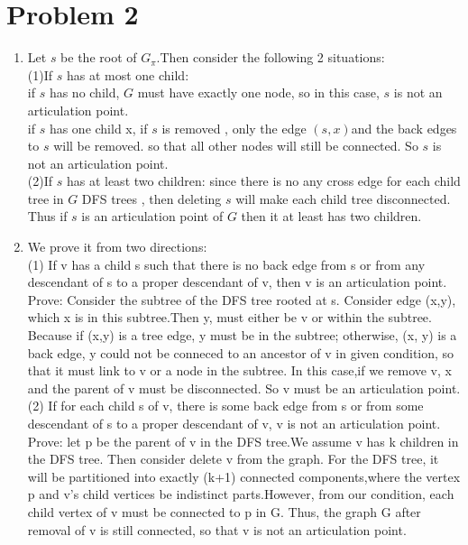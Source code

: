 \documentclass[paper=a4, fontsize=11pt]{scrartcl} %
\numberwithin{equation}{section} %
\numberwithin{figure}{section} %
\numberwithin{table}{section} %
\begin{document}
\section*{Problem 2}

\begin{enumerate}[label={2.(\alph*)}]
 \item Let ${s}$ be the root of ${G_\pi}$.Then consider the following 2 situations: \\
(1)If ${s}$ has at most one child: \\
if ${s}$ has no child, ${G}$ must have exactly one node, so in this case, ${s}$ is not an articulation point.\\
if ${s}$ has one child x, if ${s}$ is removed , only the edge ${(s,x)}$and the back edges to ${s}$ will be removed. so that all other nodes will still be connected. So ${s}$ is not an articulation point.\\
(2)If  ${s}$ has at least two children: since there is no any cross edge for each child tree in ${G}$ DFS trees , then deleting  ${s}$ will make each child tree disconnected. Thus if ${s}$ is an articulation point of ${G}$ then it at least has two children.

  \item 
We prove it from two directions:\\
(1) If v has a child s such that there is no back edge from s or from any descendant
of s to a proper descendant of v, then v is an articulation point.\\
Prove: Consider the subtree of the DFS tree rooted at s. Consider edge (x,y), which x is  in this subtree.Then y, must either be v or within the subtree. Because if (x,y) is a tree edge, y must be in the subtree; otherwise, (x, y) is a back edge, y could not be conneced to an ancestor of v in given condition, so that it must link to v or a node in the subtree. In this case,if we remove v, x and the parent of v  must be disconnected. So v must be an articulation point.\\
(2) If for each child s of v, there is some back edge from s or from some descendant
of s to a proper descendant of v, v is not an articulation point. \\
Prove: let p be the parent of v in the DFS tree.We assume v has k children in the DFS tree. Then consider delete v from the graph. For the DFS tree, it will be partitioned into exactly (k+1) connected components,where the vertex p and v's child vertices be indistinct parts.However, from our condition, each child vertex of v  must be connected to p in G. Thus, the graph G after removal of v is still connected, so that v is not an articulation point.


\end{enumerate}
\end{document}
